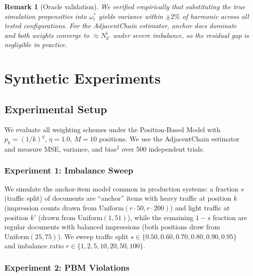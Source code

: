 \documentclass[sigconf]{acmart}
\newtheorem{remark}{Remark}
\begin{document}
\begin{remark}[Oracle validation]
\label{rem:oracle}
We verified empirically that substituting the true simulation propensities into $\omega_i^*$ yields variance within $\pm 2\%$ of harmonic across all tested configurations. For the AdjacentChain estimator, anchor docs dominate and both weights converge to $\approx N_{k'}^i$ under severe imbalance, so the residual gap is negligible in practice.
\end{remark}

\section{Synthetic Experiments}
\label{sec:synthetic}

\subsection{Experimental Setup}

We evaluate all weighting schemes under the Position-Based Model with $p_k = (1/k)^\eta$, $\eta = 1.0$, $M = 10$ positions. We use the AdjacentChain estimator \cite{agarwal2019estimating} and measure MSE, variance, and bias$^2$ over 500 independent trials.

\subsubsection{Experiment 1: Imbalance Sweep}
\label{sec:exp1}

We simulate the anchor-item model common in production systems: a fraction $s$ (traffic split) of documents are ``anchor'' items with heavy traffic at position $k$ (impression counts drawn from $\mathrm{Uniform}(r \cdot 50, r \cdot 200)$) and light traffic at position $k'$ (drawn from $\mathrm{Uniform}(1, 51)$), while the remaining $1-s$ fraction are regular documents with balanced impressions (both positions draw from $\mathrm{Uniform}(25, 75)$). We sweep traffic split $s \in \{0.50, 0.60, 0.70, 0.80, 0.90, 0.95\}$ and imbalance ratio $r \in \{1, 2, 5, 10, 20, 50, 100\}$.

\subsubsection{Experiment 2: PBM Violations}
\label{sec:exp2}
\end{document}
